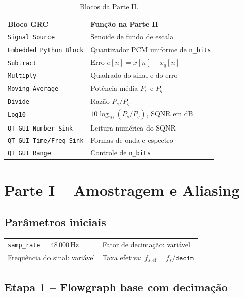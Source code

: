 \documentclass[11pt,a4paper]{article}
\begin{document}
\begin{table}[H]
  \centering
  \begin{tabular}{l l}
    \toprule
    \textbf{Bloco GRC} & \textbf{Função na Parte II} \\
    \midrule
    \texttt{Signal Source}        & Senoide de fundo de escala \\
    \texttt{Embedded Python Block} & Quantizador PCM uniforme de \texttt{n\_bits} \\
    \texttt{Subtract}             & Erro $e[n]=x[n]-x_q[n]$ \\
    \texttt{Multiply}             & Quadrado do sinal e do erro \\
    \texttt{Moving Average}       & Potência média $P_s$ e $P_q$ \\
    \texttt{Divide}               & Razão $P_s/P_q$ \\
    \texttt{Log10}                & $10\log_{10}(P_s/P_q)$, SQNR em dB \\
    \texttt{QT GUI Number Sink}   & Leitura numérica do SQNR \\
    \texttt{QT GUI Time/Freq Sink} & Formas de onda e espectro \\
    \texttt{QT GUI Range}         & Controle de \texttt{n\_bits} \\
    \bottomrule
  \end{tabular}
  \caption{Blocos da Parte II.}
  \label{tab:blocos2}
\end{table}

\section{Parte I -- Amostragem e Aliasing}

\subsection*{Parâmetros iniciais}

\begin{center}
\begin{tabular}{l l}
  \texttt{samp\_rate} = 48\,000\,Hz & Fator de decimação: variável \\
  Frequência do sinal: variável & Taxa efetiva: $f_{s,\text{ef}} = f_s/\texttt{decim}$ \\
\end{tabular}
\end{center}

\subsection*{Etapa 1 -- Flowgraph base com decimação}
\end{document}
